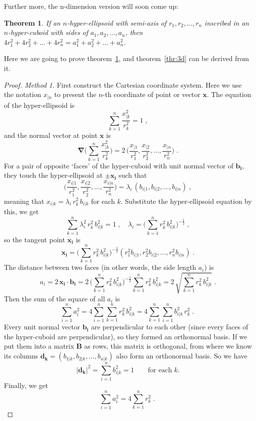 \documentclass[10pt,a4paper]{article}
\newtheorem{theorem}{Theorem}
\begin{document}
	Further more, the n-dimension version will soon come up:
	\begin{theorem}
		\label{thr:nd}
		If an $n$-hyper-ellipsoid with semi-axis of $r_1,r_2,\ldots,r_n$ inscribed in an $n$-hyper-cuboid with sides of $a_1,a_2,\ldots,a_n$, then $4r_1^2+4r_2^2+\ldots+4r_n^2=a_1^2+a_2^2+\ldots+a_n^2$.
	\end{theorem}
	Here we are going to prove theorem~\ref{thr:nd}, and theorem~\ref{thr:3d} can be derived from it.
	\begin{proof}[Proof. Method 1]
		First construct the Cartesian coordinate system. Here we use the notation $x_{|n}$ to present the $n$-th coordinate of point or vector $\mathbf{x}$. The equation of the  hyper-ellipsoid is
		\[
		\sum_{k=1}^{n}\frac{x_{|k}^2}{r_k^2}=1\;,
		\] 
		and the normal vector at point $\mathbf{x}$ is
		\[
		\mathbf{\nabla}\bigg(\sum_{k=1}^{n}\frac{x_{|k}^2}{r_k^2}\bigg)=2\,\bigg(\frac{x_{|1}}{r_1^2},\frac{x_{|2}}{r_2^2},\ldots,\frac{x_{|n}}{r_n^2}\bigg)\;.
		\]
		For a pair of opposite `faces' of the hyper-cuboid with unit normal vector of $\mathbf{b_i}$, they touch the hyper-ellipsoid at $\pm\mathbf{x_i}$ such that
		\[
		\bigg(\frac{x_{i|1}}{r_1^2},\frac{x_{i|2}}{r_2^2},\ldots,\frac{x_{i|n}}{r_n^2}\bigg)=\lambda_i\,(b_{i|1},b_{i|2},\ldots,b_{i|n})\;,
		\]
		meaning that $x_{i|k}=\lambda _i\,r_k^2 \,b_{i|k}$ for each $k$. Substitute the hyper-ellipsoid equation by this, we get
		\[
		\sum_{k=1}^{n}\lambda_i^2\,r_k^2 \,b_{i|k}^2=1\;,\quad
		\lambda_i=\bigg( \sum_{k=1}^{n}r_k^2\,b_{i|k}^2 \bigg)^{-\frac{1}{2}}\;,
		\]
		so the tangent point $\mathbf{x_i}$ is
		\[
		\mathbf{x_i}=\bigg( \sum_{k=1}^{n}r_k^2\,b_{i|k}^2 \bigg)^{-\frac{1}{2}} (r_1^2b_{i|1},r_2^2b_{i|2},\ldots,r_n^2b_{i|n})\;.
		\]
		The distance between two faces (in other words, the side length $a_i$) is
		\[
		a_i=2\,\mathbf{x_i}\cdot\mathbf{b_i}=2\,\bigg( \sum_{k=1}^{n}r_k^2\,b_{i|k}^2 \bigg)^{-\frac{1}{2}} \sum_{k=1}^{n}r_k^2\,b_{i|k}^2=2\,\sqrt{ \sum_{k=1}^{n}r_k^2\,b_{i|k}^2 }\;.
		\]
		Then the sum of the square of all $a_i$ is
		\[
		\sum_{i=1}^{n}a_i^2=4\sum_{i=1}^{n}\sum_{k=1}^{n}r_k^2\,b_{i|k}^2=4\sum_{k=1}^{n}\sum_{i=1}^{n}b_{i|k}^2\,r_k^2\;.\
		\]
		Every unit normal vector $\mathbf{b_i}$ are perpendicular to each other (since every faces of the hyper-cuboid are perpendicular), so they formed an orthonormal basis. If we put them into a matrix $\mathbf{B}$ as rows, this matrix is orthogonal, from where we know its columns $\mathbf{d_k}=(b_{1|k},b_{2|k},\ldots,b_{n|k})$ also form an orthonormal basis. So we have
		\[
		|\mathbf{d_k}|^2=\sum_{i=1}^{n}b_{i|k}^2=1\qquad\textrm{for each }k.
		\]
		Finally, we get
		\[
		\sum_{i=1}^{n}a_i^2=4\sum_{k=1}^{n}r_k^2\;.\
		\]
	\end{proof}
\end{document}
